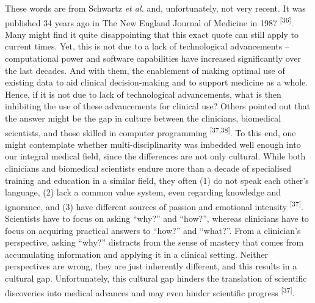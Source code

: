 \documentclass[
]{book}
\begin{document}
These words are from Schwartz \emph{et al.} and, unfortunately, not very recent. It was published 34 years ago in The New England Journal of Medicine in 1987 \textsuperscript{{[}36{]}}. Many might find it quite disappointing that this exact quote can still apply to current times. Yet, this is not due to a lack of technological advancements -- computational power and software capabilities have increased significantly over the last decades. And with them, the enablement of making optimal use of existing data to aid clinical decision-making and to support medicine as a whole. Hence, if it is not due to lack of technological advancements, what is then inhibiting the use of these advancements for clinical use? Others pointed out that the answer might be the gap in culture between the clinicians, biomedical scientists, and those skilled in computer programming \textsuperscript{{[}37,38{]}}. To this end, one might contemplate whether multi-disciplinarity was imbedded well enough into our integral medical field, since the differences are not only cultural. While both clinicians and biomedical scientists endure more than a decade of specialised training and education in a similar field, they often (1) do not speak each other's language, (2) lack a common value system, even regarding knowledge and ignorance, and (3) have different sources of passion and emotional intensity \textsuperscript{{[}37{]}}. Scientists have to focus on asking ``why?'' and ``how?'', whereas clinicians have to focus on acquiring practical answers to ``how?'' and ``what?''. From a clinician's perspective, asking ``why?'' distracts from the sense of mastery that comes from accumulating information and applying it in a clinical setting. Neither perspectives are wrong, they are just inherently different, and this results in a cultural gap. Unfortunately, this cultural gap hinders the translation of scientific discoveries into medical advances and may even hinder scientific progress \textsuperscript{{[}37{]}}.
\end{document}
